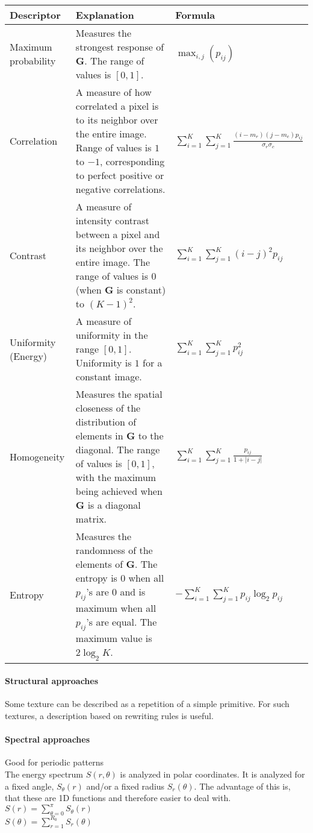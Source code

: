 \begin{table}[h]
	\begin{tabularx}{\textwidth}{lXl}
		\textbf{Descriptor} & \textbf{Explanation} & \textbf{Formula} \\ \hline
		Maximum probability & Measures the strongest response of $\mathbf{G}$. The range of values is $[0,1]$. & $\displaystyle\max_{i,j}(p_{ij})$ \\
		Correlation & A measure of how correlated a pixel is to its neighbor over the entire image. Range of values is $1$ to $-1$, corresponding to perfect positive or negative correlations. & $\displaystyle\sum\limits_{i=1}^{K}\sum\limits_{j=1}^{K}\frac{(i-m_r)(j-m_c)p_{ij}}{\sigma_r \sigma_c}$ \\
		Contrast & A measure of intensity contrast between a pixel and its neighbor over the entire image. The range of values is $0$ (when $\mathbf{G}$ is constant) to $(K-1)^2$. & $\displaystyle\sum\limits_{i=1}^{K}\sum\limits_{j=1}^{K}(i-j)^2 p_{ij}$ \\
		Uniformity (Energy) & A measure of uniformity in the range $[0,1]$. Uniformity is $1$ for a constant image. & $\displaystyle\sum\limits_{i=1}^{K}\sum\limits_{j=1}^{K} p_{ij}^2$ \\
		Homogeneity & Measures the spatial closeness of the distribution of elements in $\mathbf{G}$ to the diagonal. The range of values is $[0,1]$, with the maximum being achieved when $\mathbf{G}$ is a diagonal matrix. & $\displaystyle\sum\limits_{i=1}^{K}\sum\limits_{j=1}^{K}\frac{p_{ij}}{1+|i-j|}$ \\
		Entropy & Measures the randomness of the elements of $\mathbf{G}$. The entropy is $0$ when all $p_{ij}$'s are $0$ and is maximum when all $p_{ij}$'s are equal. The maximum value is $2 \log_2 K$. & $\displaystyle -\sum\limits_{i=1}^{K}\sum\limits_{j=1}^{K} p_{ij} \log_2 p_{ij}$ \\
		\hline
	\end{tabularx}
\end{table}


\paragraph{Structural approaches}
Some texture can be described as a repetition of a simple primitive. For such textures, a description based on rewriting rules is useful.

\paragraph{Spectral approaches}
Good for periodic patterns\\
The energy spectrum $S(r,\theta)$ is analyzed in polar coordinates. It is analyzed for a fixed angle, $S_\theta(r)$ and/or a fixed radius $S_r(\theta)$. The advantage of this is, that these are 1D functions and therefore easier to deal with.\\
$S(r)=\sum\limits_{\theta = 0}^{\pi}S_\theta(r)$\\
$S(\theta)=\sum\limits_{r=1}^{R_0}S_r(\theta)$\\

